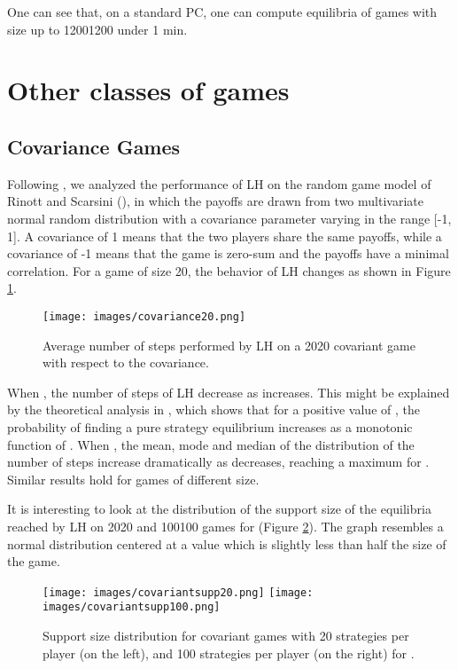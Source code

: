 \documentclass[11pt]{article}
\begin{document}
One can see that, on a standard PC, one can compute equilibria of games with size 
up to 12001200 under 1 min. 

\section{Other classes of games}

\subsection{Covariance Games}
Following \cite{gamut}, we analyzed the performance of LH on the random game model of Rinott
and Scarsini (\cite{covariance}), in which the payoffs are drawn
from two multivariate normal random distribution with a covariance
parameter \emph{} varying in the range [-1, 1]. A covariance
of 1 means that the two players share the same payoffs, while a
covariance of -1 means that the game is zero-sum and the payoffs
have a minimal correlation. For a game of size 20, the behavior of
LH changes as shown in Figure \ref{covariance20}.

\begin{figure}[h]
\centering
\texttt{[image: images/covariance20.png]}
\caption{Average number of steps performed by LH on a 2020 covariant
game with respect to the covariance.} \label{covariance20}
\end{figure}

When , the number of steps of LH decrease as 
increases. This might be explained by the theoretical analysis in
\cite{covariance}, which shows that for a positive value of ,
the probability of finding a pure strategy equilibrium increases as
a monotonic function of . When , the
mean, mode and median of the distribution of the number of steps
increase dramatically as  decreases, reaching a maximum for
. Similar
results hold for games of different size.

It is interesting to look at the distribution of the support size of
the equilibria reached by LH on 2020 and 100100 games
for  (Figure \ref{covsup}). The graph resembles a normal distribution
centered at a value which is slightly less than half the size of the game.

\begin{figure}[h]
\centering
\texttt{[image: images/covariantsupp20.png]}
\texttt{[image: images/covariantsupp100.png]}
\caption{Support size distribution for covariant games with 20 strategies per
player (on the left), and 100 strategies per player (on the right) for
.}
\label{covsup}
\end{figure}
\end{document}
